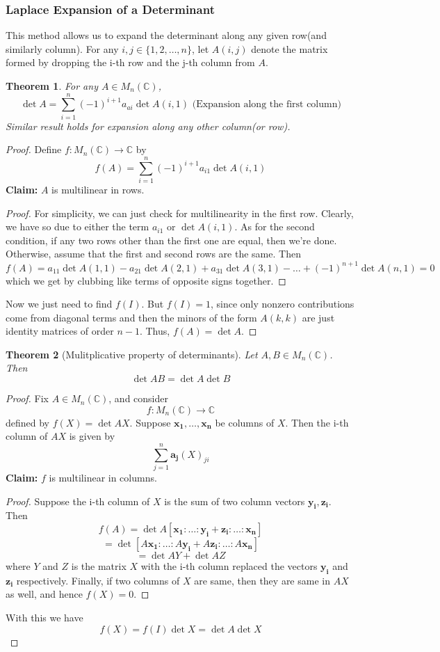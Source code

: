 \documentclass{article}
\newtheorem{theorem}{Theorem}
\begin{document}
\subsubsection*{Laplace Expansion of a Determinant}
This method allows us to expand the determinant along any given row(and similarly column).
For any $i,j\in\{1,2,\dots,n\}$, let $A(i,j)$ denote the matrix formed by dropping the i-th row and the j-th column from $A$. 
\begin{theorem}
    For any $A\in M_{n}(\mathbb{C})$, 
    $$\det{A}=\sum_{i=1}^{n}(-1)^{i+1}a_{ai}\det{A(i,1)}\text{ (Expansion along the first column)}$$ 
Similar result holds for expansion along any other column(or row).
\end{theorem}
\begin{proof}
    Define $f:M_n(\mathbb{C})\to\mathbb{C}$ by 
    $$f(A)=\sum_{i=1}^{n}(-1)^{i+1}a_{i1}\det{A(i,1)}$$
\textbf{Claim: }$A$ is multilinear in rows.
\begin{proof}
    For simplicity, we can just check for multilinearity in the first row. Clearly, we have so due to either the term $a_{i1}$ or $\det{A(i,1)}$. As for the second condition, if any two rows other than the first one are equal, then we're done. Otherwise, assume that the first and second rows are the same. Then 
    $$f(A)=a_{11}\det{A(1,1)}-a_{21}\det{A(2,1)}+a_{31}\det{A(3,1)}-\dots+(-1)^{n+1}\det{A(n,1)}=0$$
    which we get by clubbing like terms of opposite signs together.
    \renewcommand{\qedsymbol}{}
\end{proof}
Now we just need to find $f(I)$. But $f(I)=1$, since only nonzero contributions come from diagonal terms and then the minors of the form $A(k,k)$ are just identity matrices of order $n-1$. Thus, $f(A)=\det{A}$.
\end{proof}
\begin{theorem}[Mulitplicative property of determinants]
    Let $A,B\in M_{n}(\mathbb{C})$. Then 
    $$\det{AB}=\det{A}\det{B}$$
\end{theorem}
\begin{proof}
    Fix $A\in M_n(\mathbb{C})$, and consider $$f:M_{n}(\mathbb{C})\to \mathbb{C}$$
    defined by $f(X)=\det{AX}$.
    Suppose $\mathbf{x_1},\dots,\mathbf{x_n}$ be columns of $X$. Then the i-th column of $AX$ is given by
    $$\sum_{j=1}^{n}\mathbf{a_{j}}(X)_{ji}$$
    \textbf{Claim: }$f$ is multilinear in columns.\\
    \begin{proof}
        Suppose the i-th column of $X$ is the sum of two column vectors $\mathbf{y_i},\mathbf{z_i}$.
        Then $$f(A)=\det{A[\mathbf{x_1}:\dots:\mathbf{y_i}+\mathbf{z_i}:\dots:\mathbf{x_n}]}$$
        $$=\det{[A\mathbf{x_1}:\dots:A\mathbf{y_i}+A\mathbf{z_i}:\dots:A\mathbf{x_n}]}$$
        $$=\det{AY}+\det{AZ}$$
        where $Y$ and $Z$ is the matrix $X$ with the i-th column replaced the vectors $\mathbf{y_i}$ and $\mathbf{z_i}$ respectively.
        Finally, if two columns of $X$ are same, then they are same in $AX$ as well, and hence $f(X)=0$.
\renewcommand{\qedsymbol}{}
    \end{proof}
    With this we have
        $$f(X)=f(I)\det{X}=\det{A}\det{X}$$
\end{proof}
\end{document}
